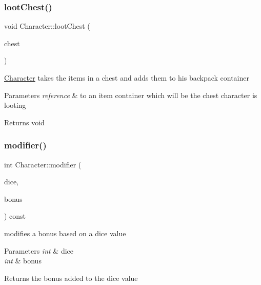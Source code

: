 \subsubsection{\texorpdfstring{loot\+Chest()}{lootChest()}}
{\footnotesize\ttfamily void Character\+::loot\+Chest (\begin{DoxyParamCaption}\item[{\hyperlink{class_item_container}{Item\+Container} $\ast$}]{chest }\end{DoxyParamCaption})}

\hyperlink{class_character}{Character} takes the items in a chest and adds them to his backpack container 
\begin{DoxyParams}{Parameters}
{\em reference} & to an item container which will be the chest character is looting \\
\hline
\end{DoxyParams}
\begin{DoxyReturn}{Returns}
void 
\end{DoxyReturn}
\hypertarget{class_character_a1993821300c40564da5ec71e6fe32445}{}\label{class_character_a1993821300c40564da5ec71e6fe32445} 
\subsubsection{\texorpdfstring{modifier()}{modifier()}}
{\footnotesize\ttfamily int Character\+::modifier (\begin{DoxyParamCaption}\item[{int}]{dice,  }\item[{int}]{bonus }\end{DoxyParamCaption}) const}

modifies a bonus based on a dice value 
\begin{DoxyParams}{Parameters}
{\em int} & dice \\
\hline
{\em int} & bonus \\
\hline
\end{DoxyParams}
\begin{DoxyReturn}{Returns}
the bonus added to the dice value 
\end{DoxyReturn}
\hypertarget{class_character_a1238d246855052b98f8c6f525e238bba}{}\label{class_character_a1238d246855052b98f8c6f525e238bba} 
